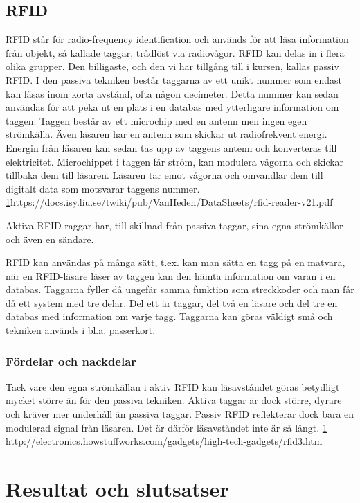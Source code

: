 \documentclass[a4paper,12pt,fleqn]{article}
\begin{document}
\subsection{RFID}
RFID står för radio-frequency identification och används för att läsa information från objekt, så kallade taggar, trådlöst via radiovågor. RFID kan delas in i flera olika grupper. Den billigaste, och den vi har tillgång till i kursen, kallas passiv RFID. I den passiva tekniken består taggarna av ett unikt nummer som endast kan läsas inom korta avstånd, ofta någon decimeter. Detta nummer kan sedan användas för att peka ut en plats i en databas med ytterligare information om taggen. Taggen består av ett microchip med en antenn men ingen egen strömkälla. Även läsaren har en antenn som skickar ut radiofrekvent energi. Energin från läsaren kan sedan tas upp av taggens antenn och konverteras till elektricitet. Microchippet i taggen får ström, kan modulera vågorna och skickar tillbaka dem till läsaren. Läsaren tar emot vågorna och omvandlar dem till digitalt data som motsvarar taggens nummer.
\ref{}https://docs.isy.liu.se/twiki/pub/VanHeden/DataSheets/rfid-reader-v21.pdf

Aktiva RFID-raggar har, till skillnad från passiva taggar, sina egna strömkällor och även en sändare.

RFID kan användas på många sätt, t.ex. kan man sätta en tagg på en matvara, när en RFID-läsare läser av taggen kan den hämta information om varan i en databas. Taggarna fyller då ungefär samma funktion som streckkoder och man får då ett system med tre delar. Del ett är taggar, del två en läsare och del tre en databas med information om varje tagg. Taggarna kan göras väldigt små och tekniken används i bl.a. passerkort.

\subsubsection{Fördelar och nackdelar}
Tack vare den egna strömkällan i aktiv RFID kan läsavståndet göras betydligt mycket större än för den passiva tekniken. Aktiva taggar är dock större, dyrare och kräver mer underhåll än passiva taggar. Passiv RFID reflekterar dock bara en modulerad signal från läsaren. Det är därför läsavståndet inte är så långt.
\ref{} http://electronics.howstuffworks.com/gadgets/high-tech-gadgets/rfid3.htm


\section{Resultat och slutsatser}
\end{document}

